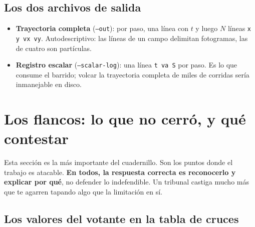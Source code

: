 \documentclass[11pt]{article}
\begin{document}
\subsection{Los dos archivos de salida}

\begin{itemize}
  \item \textbf{Trayectoria completa} (\texttt{--out}): por paso, una línea con
    $t$ y luego $N$ líneas \texttt{x y vx vy}. Autodescriptivo: las líneas de un
    campo delimitan fotogramas, las de cuatro son partículas.
  \item \textbf{Registro escalar} (\texttt{--scalar-log}): una línea
    \texttt{t va S} por paso. Es lo que consume el barrido; volcar la
    trayectoria completa de miles de corridas sería inmanejable en disco.
\end{itemize}


\section{Los flancos: lo que no cerró, y qué contestar}
\label{sec:flancos}

Esta sección es la más importante del cuadernillo. Son los puntos donde el
trabajo es atacable. \textbf{En todos, la respuesta correcta es reconocerlo y
explicar por qué}, no defender lo indefendible. Un tribunal castiga mucho más
que te agarren tapando algo que la limitación en sí.

\subsection{Los valores del votante en la tabla de cruces}

\end{document}
